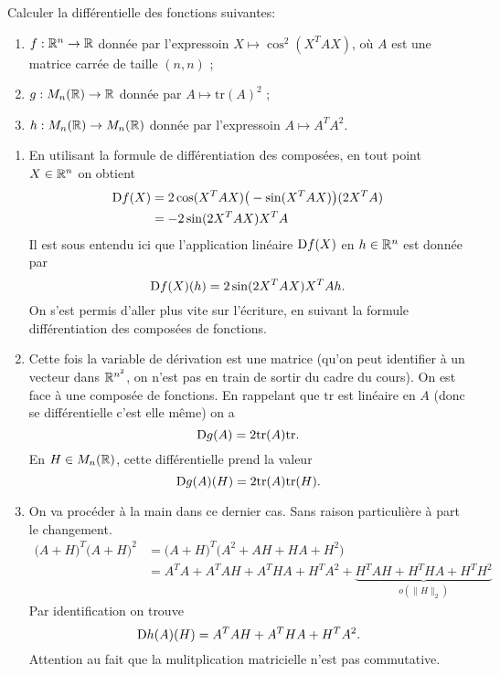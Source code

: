 \documentclass[11pt, a4paper]{article}
\begin{document}
\begin{question}
  Calculer la différentielle des fonctions suivantes:
  \begin{enumerate}
  \item $f : \mathbb{R}^n \rightarrow \mathbb{R}$ donnée par l'expressoin
    $X \mapsto \cos^2(X^TAX)$, où $A$ est une matrice carrée de taille
    $(n, n)$ ;
  \item $g : M_n(\mathbb{R}) \rightarrow \mathbb{R}$ donnée par
    $A \mapsto \mathrm{tr}(A)^2$ ;
  \item $h : M_n(\mathbb{R}) \rightarrow M_n(\mathbb{R})$ donnée par l'expressoin
    $A \mapsto A^TA^2$.
  \end{enumerate}
\end{question}

\begin{solution}
  \begin{enumerate}
  \item En utilisant la formule de différentiation des composées, en
    tout point $X \in \mathbb{R}^n$ on obtient
    \begin{align}
    \operatorname{D\!}{f}(X) & = 2\cos(X^TAX)\big(-\sin(X^TAX)\big)(2X^TA) \\
              & = -2\sin(2X^TAX)X^TA
    \end{align}
    Il est sous entendu ici que l'application linéaire $\operatorname{D\!}{f}(X)$ en
    $h \in \mathbb{R}^n$ est donnée par
    \[
    \operatorname{D\!}{f}(X)(h) = 2\sin(2X^TAX)X^TAh.
    \]
    On s'est permis d'aller plus vite sur l'écriture, en suivant la
    formule différentiation des composées de fonctions.
  \item Cette fois la variable de dérivation est une matrice (qu'on
    peut identifier à un vecteur dans $\mathbb{R}^{n^2}$, on n'est pas en
    train de sortir du cadre du cours). On est face à une composée de
    fonctions. En rappelant que $\mathrm{tr}$ est linéaire en $A$
    (donc se différentielle c'est elle même) on a
    \[
    \operatorname{D\!}{g}(A) = 2\mathrm{tr}(A)\mathrm{tr}.
    \]
    En $H\in M_n(\mathbb{R})$, cette différentielle prend la valeur
    \[
    \operatorname{D\!}{g}(A)(H) = 2\mathrm{tr}(A)\mathrm{tr}(H).
    \]
  \item On va procéder à la main dans ce dernier cas. Sans raison
    particulière à part le changement.
    \begin{align}
      \big(A+H\big)^T\big(A+H\big)^2 & = \big(A+H\big)^T\big(A^2 + AH + HA + H^2) \\
                                     & = A^TA + A^TAH + A^THA + H^TA^2 + \underbrace{H^TAH + H^THA + H^TH^2}_{o(\|H\|_2)}
    \end{align}
    Par identification on trouve
    \[
    \operatorname{D\!}{h}(A)(H) = A^TAH + A^THA + H^TA^2.
    \]
    Attention au fait que la mulitplication matricielle n'est pas commutative.
  \end{enumerate}
\end{solution}
\end{document}
